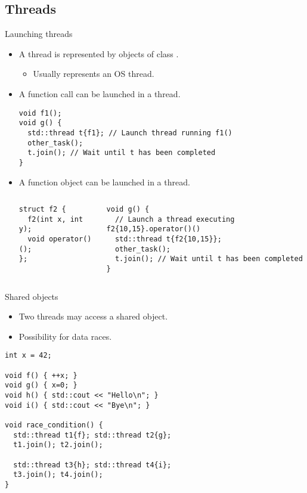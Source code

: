 \subsection{Threads}

\begin{frame}[t,fragile]{Launching threads}
\begin{itemize}
  \item A thread is represented by objects of class .
    \begin{itemize}
      \item Usually represents an OS thread.
    \end{itemize}

  \pause
  \item A function call can be launched in a thread.
\begin{lstlisting}
void f1();
void g() {
  std::thread t{f1}; // Launch thread running f1()
  other_task();
  t.join(); // Wait until t has been completed
}
\end{lstlisting}

  \pause
  \item A function object can be launched in a thread.
\begin{columns}[T]
\begin{lstlisting}
struct f2 {
  f2(int x, int y);
  void operator()();
};
\end{lstlisting}

\begin{lstlisting}
void g() {
  // Launch a thread executing f2{10,15}.operator()()
  std::thread t{f2{10,15}}; 
  other_task();
  t.join(); // Wait until t has been completed
}
\end{lstlisting}
\end{columns}
\end{itemize}
\end{frame}

\begin{frame}[t,fragile]{Shared objects}
\begin{itemize}
  \item Two threads may access a shared object.
  \item Possibility for data races.
\end{itemize}
\begin{lstlisting}
int x = 42;

void f() { ++x; }
void g() { x=0; }
void h() { std::cout << "Hello\n"; }
void i() { std::cout << "Bye\n"; }

void race_condition() {
  std::thread t1{f}; std::thread t2{g};
  t1.join(); t2.join();

  std::thread t3{h}; std::thread t4{i};
  t3.join(); t4.join();
}
\end{lstlisting}
\end{frame}

